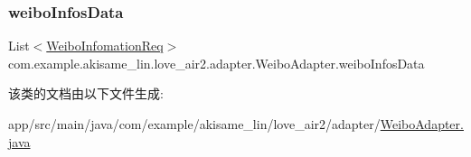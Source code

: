 \mbox{\label{classcom_1_1example_1_1akisame__lin_1_1love__air2_1_1adapter_1_1_weibo_adapter_a065026a34dcf4c259c37e5c164922c2e}} 
\subsubsection{\texorpdfstring{weiboInfosData}{weiboInfosData}}
{\footnotesize\ttfamily List$<$\mbox{\hyperlink{classcom_1_1example_1_1akisame__lin_1_1love__air2_1_1bean1_1_1_weibo_infomation_req}{Weibo\+Infomation\+Req}}$>$ com.\+example.\+akisame\+\_\+lin.\+love\+\_\+air2.\+adapter.\+Weibo\+Adapter.\+weibo\+Infos\+Data\hspace{0.3cm}{\ttfamily [private]}}



该类的文档由以下文件生成\+:\begin{DoxyCompactItemize}
\item 
app/src/main/java/com/example/akisame\+\_\+lin/love\+\_\+air2/adapter/\mbox{\hyperlink{_weibo_adapter_8java}{Weibo\+Adapter.\+java}}\end{DoxyCompactItemize}
